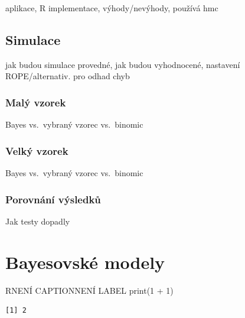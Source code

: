 \documentclass[
  11pt,
  a4paper]{report}
\begin{document}
aplikace, R implementace, výhody/nevýhody, používá hmc

\section{Simulace}\label{simulace}

jak budou simulace provedné, jak budou vyhodnocené, nastavení
ROPE/alternativ. pro odhad chyb

\subsection{Malý vzorek}\label{maluxfd-vzorek}

Bayes vs.~vybraný vzorec vs.~binomic

\subsection{Velký vzorek}\label{velkuxfd-vzorek}

Bayes vs.~vybraný vzorec vs.~binomic

\subsection{Porovnání výsledků}\label{porovnuxe1nuxed-vuxfdsledkux16f}

Jak testy dopadly



\chapter{Bayesovské modely}\label{bayesovskuxe9-modely}

\begin{code}{R}{NENÍ CAPTION}{NENÍ LABEL}
print(1 + 1)
\end{code}

\begin{verbatim}
[1] 2
\end{verbatim}
\end{document}
